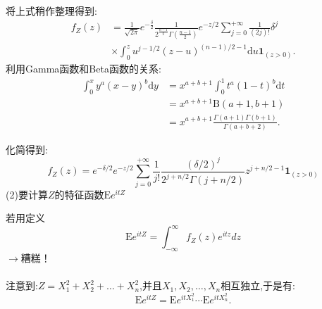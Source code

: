 	\begin{frame}
		将上式稍作整理得到:
		\begin{equation}
			\begin{split}
				f_Z(z) &= 
					\frac{1}{\sqrt{2\pi}}e^{-\frac{\delta}{2}}\frac{1}{2^{\frac{n-1}{2}}\Gamma(\frac{n-1}{2})}e^{-z/2}\sum_{j=0}^{+\infty}\frac{1}{(2j)!}\delta^j \\
					&\times\int_{0}^{z}u^{j-1/2}(z-u)^{(n-1)/2-1}\mathrm{d}u \bm{1}_{(z>0)}.
			\end{split}
		\end{equation}
		利用Gamma函数和Beta函数的关系:
		\begin{equation}
			\begin{split}
					\int_{0}^{x}y^a(x-y)^b\mathrm{d}y &= x^{a+b+1}\int_{0}^{1}t^a(1-t)^b\mathrm{d}t \\
					&= x^{a+b+1}\mathrm{B}(a+1,b+1) \\
					&= x^{a+b+1}\frac{\Gamma(a+1)\Gamma(b+1)}{\Gamma(a+b+2)}.
			\end{split}
		\end{equation}
	\end{frame}

	\begin{frame}
		化简得到:
		\begin{equation}
			f_Z(z) =e^{-\delta/2}e^{-z/2}\sum_{j=0}^{+\infty}\frac{1}{j!}\frac{(\delta/2)^j}{2^{j+n/2}\Gamma(j+n/2)}z^{j+n/2-1}\bm{1}_{(z>0)}
		\end{equation}
		(2)要计算$Z$的特征函数$\mathrm{E}e^{itZ}$
		
		若用定义
		\begin{equation}
			\mathrm{E}e^{itZ} = \int_{-\infty}^{\infty}f_Z(z)e^{itz}dz
		\end{equation}
		$\longrightarrow$糟糕！
		\\ \hspace*{\fill} \\%
		注意到:$Z=X_1^2+X_2^2+\dots+X_n^2$,并且$X_1,X_2,\dots,X_n$相互独立,于是有:
		\begin{equation}
			\mathrm{E}e^{itZ} = \mathrm{E}e^{itX_1^2}\cdots\mathrm{E}e^{itX_n^2}.
		\end{equation}
	\end{frame}

